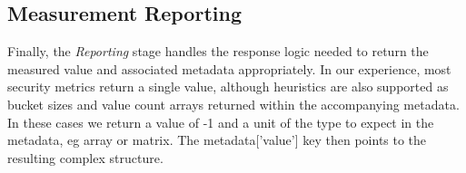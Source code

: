 



\subsection{Measurement Reporting}\label{sec:automation:methodology:report}

Finally, the \textit{Reporting} stage handles the response logic needed to return the measured value and associated metadata appropriately. In our experience, most security metrics return a single value, although heuristics are also supported as bucket sizes and value count arrays returned within the accompanying metadata. In these cases we return a value of -1 and a unit of the type to expect in the metadata, eg array or matrix. The metadata['value'] key then points to the resulting complex structure.